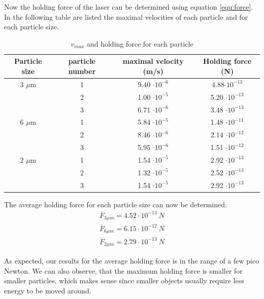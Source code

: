 \documentclass{article}
\begin{document}
Now the holding force of the laser can be determined using equation \ref{equ:force}.
In the following table are listed the maximal velocities of each particle and for each particle size.
\begin{table}[H]
    \centering
    \begin{tabular}{c|c|c|c}
        Particle size & particle number & maximal velocity (m/s) & Holding force (N) \\
        \hline
        3 $\mu$m & 1 & 9.40 $\cdot 10^{-6}$ & 4.88$\cdot 10^{-13}$\\
        & 2 & 1.00 $\cdot 10^{-5}$ & 5.20 $\cdot 10^{-13}$ \\
        & 3 & 6.71 $\cdot 10^{-6}$ & 3.48 $\cdot 10^{-13}$\\
        \hline
        6 $\mu$m & 1 & 5.84 $\cdot 10^{-5}$ & 1.48 $\cdot 10^{-11}$ \\
        & 2 & 8.46 $\cdot 10^{-6}$ & 2.14 $\cdot 10^{-12}$\\
        & 3 & 5.95 $\cdot 10^{-6}$ &1.51 $\cdot 10^{-12}$\\
        \hline
        2 $\mu$m & 1 & 1.54 $\cdot 10^{-5}$ & 2.92 $\cdot 10^{-13}$ \\
        & 2 & 1.32 $\cdot 10^{-5}$ & 2.52 $\cdot 10^{-13}$\\
        & 3 & 1.54 $\cdot 10^{-5}$ & 2.92 $\cdot 10^{-13}$\\
    \end{tabular}
    \caption{ $v_{max}$ and holding force for each particle }
    \label{tab:my_label}
\end{table}

The average holding force for each particle size can now be determined:
\begin{align*}
    \overline{F}_{3\mu m} = 4.52 \cdot 10^{-13} \ N \\
    \overline{F}_{6\mu m} = 6.15 \cdot 10^{-12} \ N  \\
    \overline{F}_{2\mu m} = 2.79 \cdot 10^{-13} \ N
\end{align*}

As expected, our results for the average holding force is in the range of a few pico Newton. We can also observe, that the maximum holding force is smaller for smaller particles, which makes sense since smaller objects usually require less energy to be moved around. 
\end{document}
